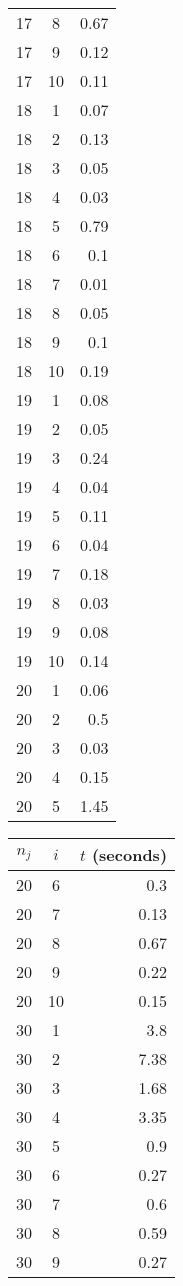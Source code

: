 \documentclass[13pt, letterpaper, oneside]{book}
\begin{document}
\begin{multicols}{4}
\begin{tabular}{c c r}
17 & 8 & 0.67 \\
17 & 9 & 0.12 \\
17 & 10 & 0.11 \\
18 & 1 & 0.07 \\
18 & 2 & 0.13 \\
18 & 3 & 0.05 \\
18 & 4 & 0.03 \\
18 & 5 & 0.79 \\
18 & 6 & 0.1 \\
18 & 7 & 0.01 \\
18 & 8 & 0.05 \\
18 & 9 & 0.1 \\
18 & 10 & 0.19 \\
19 & 1 & 0.08 \\
19 & 2 & 0.05 \\
19 & 3 & 0.24 \\
19 & 4 & 0.04 \\
19 & 5 & 0.11 \\
19 & 6 & 0.04 \\
19 & 7 & 0.18 \\
19 & 8 & 0.03 \\
19 & 9 & 0.08 \\
19 & 10 & 0.14 \\
20 & 1 & 0.06 \\
20 & 2 & 0.5 \\
20 & 3 & 0.03 \\
20 & 4 & 0.15 \\
20 & 5 & 1.45 \\
\bottomrule
\end{tabular}
\vfill
\columnbreak
\begin{tabular}{c c r}
\toprule
$n_j$ & $i$ & $t$ (seconds) \\
\midrule 
20 & 6 & 0.3 \\
20 & 7 & 0.13 \\
20 & 8 & 0.67 \\
20 & 9 & 0.22 \\
20 & 10 & 0.15 \\
30 & 1 & 3.8 \\
30 & 2 & 7.38 \\
30 & 3 & 1.68 \\
30 & 4 & 3.35 \\
30 & 5 & 0.9 \\
30 & 6 & 0.27 \\
30 & 7 & 0.6 \\
30 & 8 & 0.59 \\
30 & 9 & 0.27 \\

\end{tabular}
\end{multicols}
\end{document}
